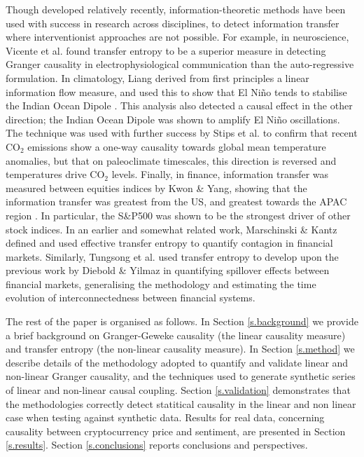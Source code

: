 \documentclass[]{rsos}%
\begin{document}
  Though developed relatively recently, information-theoretic methods have been used with success in research across disciplines, to detect information transfer where interventionist approaches are not possible. For example, in neuroscience, Vicente et al. \cite{vicente2011transfer} found transfer entropy to be a superior measure in {\color{blue} detecting Granger causality} in electrophysiological communication than {\color{blue}the auto-regressive formulation}. In climatology, Liang derived from first principles a linear information flow measure, and used this to show that El Ni\~{n}o tends to stabilise the Indian Ocean Dipole \cite{san2014unraveling}. This analysis also detected a causal effect in the other direction; the Indian Ocean Dipole was shown to amplify El Ni\~{n}o oscillations. The technique was used with further success by Stips et al. \cite{stips2016causal} to confirm that recent CO$_2$ emissions show a one-way causality towards global mean temperature anomalies, but that on paleoclimate timescales, this direction is reversed and temperatures drive CO$_2$ levels. Finally, in finance, information transfer was measured between equities indices by Kwon \& Yang, showing that the information transfer was greatest from the US, and greatest towards the APAC region \cite{kwon2008information}. In particular, the S\&P500 was shown to be the strongest driver of other stock indices. In an earlier and somewhat related work, Marschinski \& Kantz   \cite{Marschinski2002} defined and used effective transfer entropy to quantify contagion in financial markets. Similarly, Tungsong et al. \cite{tungsong2018} used transfer entropy to develop upon the previous work by Diebold \& Yilmaz \cite{diebold2009measuring} in quantifying spillover effects between financial markets, generalising the methodology and estimating the time evolution of interconnectedness between financial systems.

 The rest of the paper is organised as follows. In Section \ref{s.background} we provide a brief background on {\color{blue}Granger-Geweke causality} ({\color{blue}the} linear causality measure) and transfer entropy ({\color{blue}the} non-linear causality measure). In Section \ref{s.method} we describe details of the methodology adopted to quantify and validate linear and non-linear {\color{blue}Granger} causality, and the techniques used to generate synthetic series of linear and non-linear causal coupling. Section \ref{s.validation} demonstrates that the methodologies correctly detect {\color{blue}statitical} causality in the linear and non linear case when testing against synthetic data. Results for real data, concerning causality between cryptocurrency price and sentiment, are presented in Section \ref{s.results}. Section \ref{s.conclusions} reports conclusions and perspectives.
\end{document}
